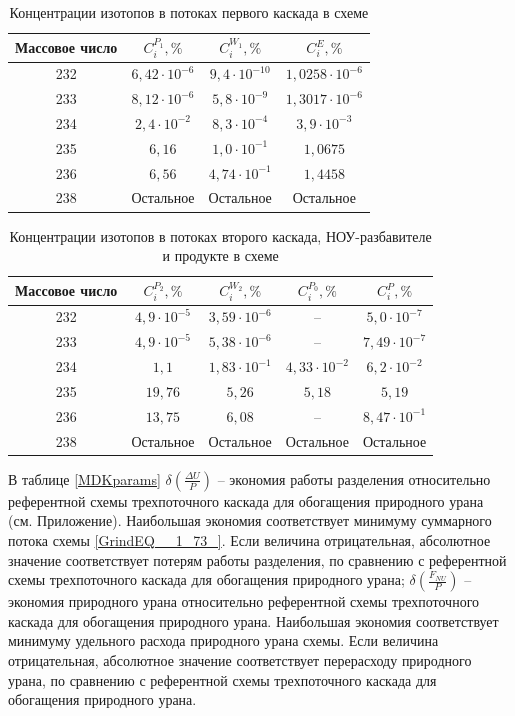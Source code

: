 \begin{table}
\begin{tabular}{|c|c|c|c|}
    \hline Массовое число & $C_{i}^{P_{1}}, \%$ & $C_{i}^{W_{1}}, \%$ & $C_{i}^{E}, \%$\\
    \hline 232 & $6,42\cdot10^{-6}$ & $9,4\cdot10^{-10}$ & $1,0258\cdot10^{-6}$\\
    233 & $8,12\cdot10^{-6}$ & $5,8\cdot10^{-9}$ & $1,3017\cdot10^{-6}$\\
    234 & $2,4\cdot10^{-2}$ & $8,3\cdot10^{-4}$ & $3,9\cdot10^{-3}$\\
    235 & $6,16$ & $1,0\cdot10^{-1}$ & $1,0675$\\
    236 & $6,56$ & $4,74\cdot10^{-1}$ & $1,4458$\\
    238 & Остальное & Остальное & Остальное\\
    \hline
\end{tabular}
\caption{Концентрации изотопов в потоках первого каскада в схеме}\label{MDKcas1params}
\end{table}

\begin{table}
    \begin{tabular}{|c|c|c|c|c|}
        \hline Массовое число & $C_{i}^{P_{2}}, \%$ & $C_{i}^{W_{2}}, \%$ & $C_{i}^{P_{0}}, \%$ & $C_{i}^{P}, \%$\\
        \hline 232 & $4,9\cdot10^{-5}$ & $3,59\cdot10^{-6}$ & -- & $5,0\cdot10^{-7}$\\
        233 & $4,9\cdot10^{-5}$ & $5,38\cdot10^{-6}$ & -- & $7,49\cdot10^{-7}$\\
        234 & $1,1$ & $1,83\cdot10^{-1}$ & $4,33\cdot10^{-2}$ & $6,2\cdot10^{-2}$\\
        235 & $19,76$ & $5,26$ & $5,18$  & $5,19$\\
        236 & $13,75$ & $6,08$ & --  & $8,47\cdot10^{-1}$\\
        238 & Остальное & Остальное & Остальное  & Остальное\\
        \hline
\end{tabular}
\caption{Концентрации изотопов в потоках второго каскада, НОУ-разбавителе и продукте в схеме}\label{MDKcas2params}
\end{table}

В таблице \ref{MDKparams} $\delta(\frac{\Delta U}{P})$ -- экономия работы разделения относительно референтной схемы трехпоточного каскада для обогащения природного урана (см. Приложение). Наибольшая экономия соответствует минимуму суммарного потока схемы \ref{GrindEQ__1_73_}. Если величина отрицательная, абсолютное значение соответствует потерям работы разделения, по сравнению с референтной схемы трехпоточного каскада для обогащения природного урана; $\delta(\frac{F_{NU}}{P})$ -- экономия природного урана относительно референтной схемы трехпоточного каскада для обогащения природного урана.  Наибольшая экономия соответствует минимуму удельного расхода природного урана схемы. Если величина отрицательная, абсолютное значение соответствует перерасходу природного урана, по сравнению с референтной схемы трехпоточного каскада для обогащения природного урана.


